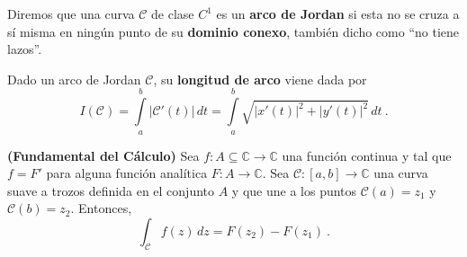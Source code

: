 \begin{defi}
    Diremos que una curva $\mathcal{C}$ de clase $C^1$ es un \textbf{arco de Jordan} si esta no se cruza a sí misma en ningún punto de su \textbf{dominio conexo}, también dicho como ``no tiene lazos''.
\end{defi}

\begin{defi}
    Dado un arco de Jordan $\mathcal{C}$, su \textbf{longitud de arco} viene dada por 
    \begin{equation}
        I(\mathcal{C}) = \int\limits_a^b |\mathcal{C}'(t)| \, dt = \int\limits_a^b \sqrt{|x'(t)|^2 + |y'(t)|^2} \, dt \ .
    \end{equation}
\end{defi}




\begin{teorema}{\textbf{(Fundamental del Cálculo)}} 
    Sea $f: A \subseteq \mathbb{C} \to \mathbb{C}$ una función continua y tal que $f = F'$ para alguna función analítica $F: A \to \mathbb{C}$. Sea $\mathcal{C}: [a,b] \to \mathbb{C}$ una curva suave a trozos definida en el conjunto $A$ y que une a los puntos $\mathcal{C}(a) = z_1$ y $\mathcal{C}(b) = z_2$. Entonces,
    \begin{equation}
        \int_\mathcal{C} f(z) \, dz = F(z_2) - F(z_1) \ .
    \end{equation}
\end{teorema}

